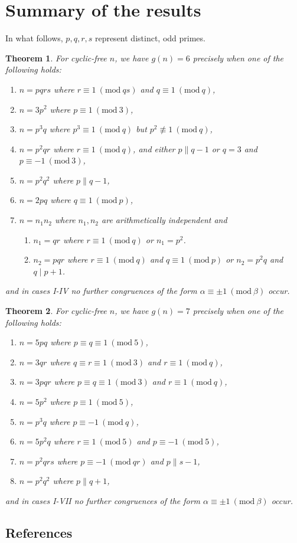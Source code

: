 \documentclass[draft]{article}
\newcommand{\Mod}[1]{\ (\mathrm{mod} \ #1)}
\theoremstyle{plain}
\newtheorem{thm}{Theorem}[section]
\theoremstyle{definition}
\begin{document}
\section{Summary of the results}
In what follows, $p, q, r, s$ represent distinct, odd primes.
\begin{thm}
	For cyclic-free $n$, we have $g(n) = 6$ precisely when one of the following holds:
	\begin{enumerate} \listspace
		\item $n = pqrs$ where $r \equiv 1 \Mod{qs}$ and $q \equiv 1 \Mod{q}$,
		\item $n = 3p^2$ where $p \equiv 1 \Mod{3}$,
		\item $n = p^3 q$ where $p^3 \equiv 1 \Mod{q}$ but $p^2 \not\equiv 1 \Mod{q}$,
		\item $n = p^2 q r$ where $r \equiv 1 \Mod{q}$, and either $p \parallel q - 1$ or $q = 3$ and $p \equiv -1 \Mod{3}$,
		\item $n = p^2 q^2$ where $p \parallel q - 1$,
		\item $n = 2pq$ where $q \equiv 1 \Mod{p}$,
		\item $n = n_1 n_2$ where $n_1, n_2$ are arithmetically independent and
		\begin{enumerate}
			\item $n_1 = qr$ where $r \equiv 1 \Mod{q}$ or $n_1 = p^2$.
			\item $n_2 = pqr$ where $r \equiv 1 \Mod{q}$ and $q \equiv 1 \Mod{p}$ or $n_2 = p^2 q$ and $q \mid p + 1$.
		\end{enumerate}
	\end{enumerate} \textspace
	and in cases I-IV no further congruences of the form $\alpha \equiv \pm 1 \Mod{\beta}$ \nolinebreak[4] \mbox{occur}.
\end{thm}
\begin{thm}
	For cyclic-free $n$, we have $g(n) = 7$ precisely when one of the following holds:
	\begin{enumerate}	\listspace
		\item $n = 5pq$ where $p \equiv q \equiv 1 \Mod{5}$,
		\item $n = 3qr$ where $q \equiv r \equiv 1 \Mod{3}$ and $r \equiv 1 \Mod{q}$,
		\item $n = 3pqr$ where $p \equiv q \equiv 1 \Mod{3}$ and $r \equiv 1 \Mod{q}$,
		\item $n = 5p^2$ where $p \equiv 1 \Mod{5}$,
		\item $n = p^3 q$ where $p \equiv -1 \Mod{q}$,
		\item $n = 5p^2 q$ where $r \equiv 1 \Mod{5}$ and $p \equiv -1 \Mod{5}$,
		\item $n = p^2 q r s$ where $p \equiv -1 \Mod{qr}$ and $p \parallel s - 1$,
		\item $n = p^2 q^2$ where $p \parallel q + 1$,
	\end{enumerate} \textspace
	and in cases I-VII no further congruences of the form $\alpha \equiv \pm 1 \Mod{\beta}$ \nolinebreak[4] \mbox{occur}.
\end{thm}

\begin{center}\section*{References}\end{center}
\printbibliography[heading=none]
\end{document}
